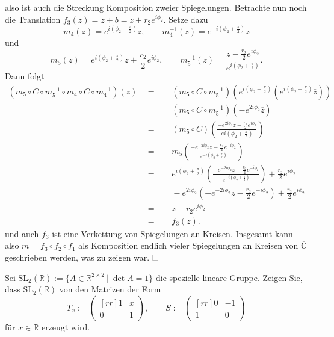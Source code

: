 \documentclass[11pt]{book}
\numberwithin{dummy}{section}
\theoremstyle{nonumberbreak}
\newenvironment{prob}[1][]{\ifthenelse{\equal{#1}{}}{\problem}{\problem[#1]}\rm}{\endproblem}
\newenvironment{sol}[1][]{\ifthenelse{\equal{#1}{}}{\solution}{\solution[#1]}\rm}{\endsolution}
\newcommand{\R}{\mathbb{R}}
\newcommand{\CC}{\overline{\mathbb{C}}}
\begin{document}
\begin{spacing}{1.4}
\begin{prob}
\begin{sol}
also ist auch die Streckung Komposition zweier Spiegelungen. Betrachte nun noch die Translation $f_3(z)=z+b=z+r_2e^{i\phi_2}$. Setze dazu
$$m_4(z)= e^{i \left(\phi_2+\frac{\pi}{2}\right)} z, \qquad m_4^{-1}(z)=e^{-i\left( \phi_2 + \frac{\pi}{2}\right)} z$$
und 
$$m_5(z)=e^{i\left(\phi_2 + \frac{\pi}{2}\right)} z + \frac{r_2}{2} e^{i\phi_2}, \qquad m_5^{-1}(z)=\frac{z-\frac{r_2}{2} e^{i\phi_2}}{e^{i\left(\phi_2 + \frac{\pi}{2}\right)}}.$$
Dann folgt
\begin{alignat*}{5}
\left(m_5 \circ C \circ m_5^{-1} \circ m_4 \circ C \circ m_4^{-1}\right)(z) \ \ &=&& \ \ (m_5 \circ C \circ m_5^{-1})\left( e^{i\left(\phi_2 + \frac{\pi}{2}\right)} \left( e^{i\left(\phi_2+ \frac{\pi}{2}\right)} \overline{z} \right) \right)\\
&=&& \ \ (m_5 \circ C \circ m_5^{-1})\left(-e^{2i\phi_2} \overline{z}\right) \\
&=&& \ \ (m_5 \circ C)\left(\frac{-e^{2i\phi_2}\overline{z} - \frac{r_2}{2} e^{i\phi_2}}{e{i\left(\phi_2 + \frac{\pi}{2}\right)}}\right) \\
&=&& \ \ m_5 \left( \frac{-e^{-2i\phi_2} z - \frac{r_2}{2} e^{-i\phi_2}}{e^{-i\left(\phi_2+\frac{\pi}{2}\right)}}\right) \\
&=&& \ \ e^{i\left(\phi_2+\frac{\pi}{2}\right)} \left(\frac{-e^{-2i\phi_2} z - \frac{r_2}{2} e^{-i\phi_2}}{e^{-i\left(\phi_2+\frac{\pi}{2}\right)}}\right) + \frac{r_2}{2} e^{i\phi_2} \\
&=&& \ \ -e^{2i\phi_2}\left( - e^{-2i\phi_2}z - \frac{r_2}{2} e^{-i\phi_2}\right) + \frac{r_2}{2} e^{i\phi_2}\\
&=&& \ \ z + r_2 e^{i\phi_2} \\
&=&& \ \ f_3(z).
\end{alignat*}
und auch $f_3$ ist eine Verkettung von Spiegelungen an Kreisen. Insgesamt kann also $m=f_3 \circ f_2 \circ f_1$ als Komposition endlich vieler Spiegelungen an Kreisen von $\CC$ geschrieben werden, was zu zeigen war. $\hfill \Box$




\end{sol}


\end{prob}


\newpage

\begin{prob}   %
Sei $\mathrm{SL}_2(\R):=\{A \in \R^{2\times2} \ \vert \ \det A=1\}$ die spezielle lineare Gruppe. Zeigen Sie, dass $\mathrm{SL}_2(\R)$ von den Matrizen der Form 
$$T_x:=\begin{pmatrix}[rr]1 & x \\[-6pt] 0 & 1 \end{pmatrix}, \qquad S:=\begin{pmatrix}[rr]0 & -1 \\[-6pt] 1 & 0 \end{pmatrix}$$
für $x \in \R$ erzeugt wird.


\end{prob}
\end{spacing}
\end{document}
